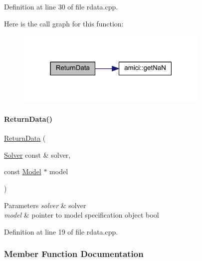 Definition at line 30 of file rdata.\+cpp.

Here is the call graph for this function\+:
\nopagebreak
\begin{figure}[H]
\begin{center}
\leavevmode
\includegraphics[width=262pt]{classamici_1_1_return_data_a8074ea697eda3da616136da2c30bc503_cgraph}
\end{center}
\end{figure}
\mbox{\label{classamici_1_1_return_data_a9fa947e466f4c7f55d36d1e81722abdc}} 
\paragraph{\texorpdfstring{ReturnData()}{ReturnData()}\hspace{0.1cm}{\footnotesize\ttfamily [2/2]}}
{\footnotesize\ttfamily \mbox{\hyperlink{classamici_1_1_return_data}{Return\+Data}} (\begin{DoxyParamCaption}\item[{\mbox{\hyperlink{classamici_1_1_solver}{Solver}} const \&}]{solver,  }\item[{const \mbox{\hyperlink{classamici_1_1_model}{Model}} $\ast$}]{model }\end{DoxyParamCaption})}


\begin{DoxyParams}{Parameters}
{\em solver} & solver \\
\hline
{\em model} & pointer to model specification object bool \\
\hline
\end{DoxyParams}


Definition at line 19 of file rdata.\+cpp.



\subsubsection{Member Function Documentation}
\mbox{\label{classamici_1_1_return_data_ab320e46748c17908f0bd4bba240b8e92}} 
